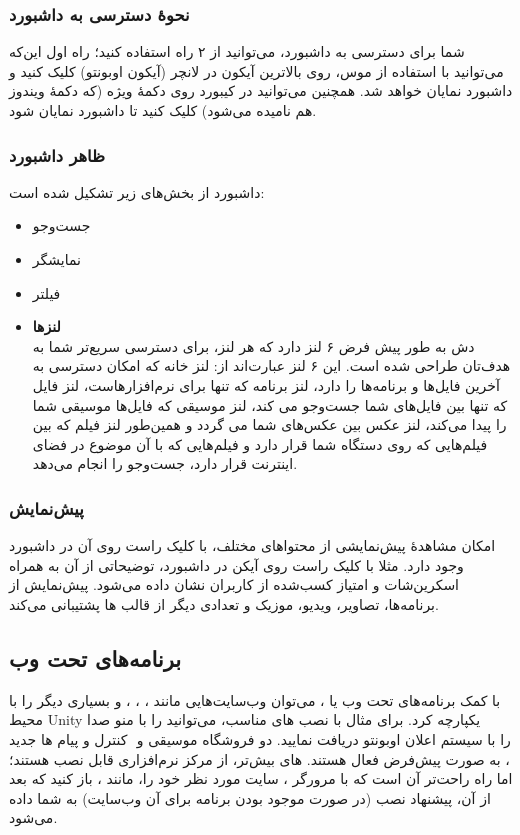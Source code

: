 \subsubsection{نحوهٔ دسترسی به داشبورد}
شما برای دسترسی به داشبورد، می‌توانید از ۲ راه استفاده کنید؛ راه اول این‌که می‌توانید با استفاده از موس، روی بالاترین آیکون در لانچر (آیکون اوبونتو) کلیک کنید و داشبورد نمایان خواهد شد. همچنین می‌توانید در کیبورد روی دکمهٔ ویژه (که دکمهٔ ویندوز هم نامیده می‌شود) کلیک کنید تا داشبورد نمایان شود.

\subsubsection{ظاهر داشبورد}
داشبورد از بخش‌های زیر تشکیل شده است:
\begin{itemize}
\item جست‌وجو
\item نمایشگر
\item فیلتر
\item \textbf{لنزها}\\
دش به طور پیش فرض ۶ لنز دارد که هر لنز، برای دسترسی سریع‌تر شما به هدف‌تان طراحی شده است. این ۶ لنز عبارت‌اند از: لنز خانه که امکان دسترسی به آخرین فایل‌ها و برنامه‌ها را دارد، لنز برنامه که تنها برای نرم‌افزارهاست، لنز فایل که تنها بین فایل‌های شما جست‌وجو می کند، لنز موسیقی که فایل‌ها موسیقی شما را پیدا می‌کند، لنز عکس بین عکس‌های شما می گردد و همین‌طور لنز فیلم که بین فیلم‌هایی که روی دستگاه شما قرار دارد و فیلم‌هایی که با آن موضوع در فضای اینترنت قرار دارد، جست‌وجو را انجام می‌دهد.
\end{itemize}

\subsubsection{پیش‌نمایش}
امکان مشاهدهٔ پیش‌نمایشی از محتواهای مختلف، با کلیک راست روی آن در داشبورد وجود دارد. مثلا با کلیک راست روی آیکن  در داشبورد، توضیحاتی از آن به همراه اسکرین‌شات و امتیاز کسب‌شده از کاربران نشان داده می‌شود. پیش‌نمایش از برنامه‌ها، تصاویر، ویدیو، موزیک و تعدادی دیگر از قالب ها پشتیبانی می‌کند.

\subsection{برنامه‌های تحت وب}
با کمک برنامه‌های تحت وب یا ، می‌توان وب‌سایت‌هایی مانند ، ، ،  و بسیاری دیگر را با محیط Unity یکپارچه کرد. برای مثال با نصب های مناسب، می‌توانید  را با منو صدا کنترل و پیام ها جدید ‎ را با سیستم اعلان اوبونتو دریافت نمایید. دو  فروشگاه موسیقی  و ، به صورت پیش‌فرض فعال هستند.  های بیش‌تر، از مرکز نرم‌افزاری قابل نصب هستند؛ اما راه راحت‌تر آن است که با مرورگر ، سایت مورد نظر خود را، مانند ، باز کنید که بعد از آن، پیشنهاد نصب (در صورت موجود بودن برنامه برای آن وب‌سایت) به شما داده می‌شود.
